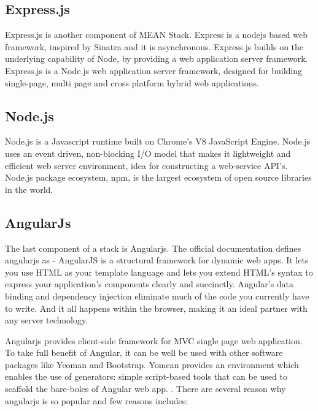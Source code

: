 		
		
		\subsection{Express.js}
		\cite{expressRef}Express.js is another component of MEAN Stack. Express is a nodejs based web framework, inspired by Sinatra and it is asynchronous. Express.js builds on the underlying capability of Node, by providing a web application server framework. Express.js is a Node.js web application server framework, designed for building single-page, multi page and cross platform hybrid web applications\cite{expressRefWiki}. 
		
		\subsection{Node.js}
		Node.js is a Javascript runtime built on Chrome’s V8 JavaScript Engine. Node.js uses an event driven, non-blocking I/O model that makes it lightweight and efficient web server environment, idea for constructing a web-service API’s\cite{Node.jsWiki}. Node.js package ecosystem, npm, is the largest ecosystem of open source libraries in the world. \cite{expressRefWiki} 
		
		\subsection{AngularJs}
		The last component of a stack is Angularjs. The official documentation \cite{Angularjs}defines angularjs as - AngularJS is a structural framework for dynamic web apps. It lets you use HTML as your template language and lets you extend HTML's syntax to express your application's components clearly and succinctly. Angular's data binding and dependency injection eliminate much of the code you currently have to write. And it all happens within the browser, making it an ideal partner with any server technology.
		
		Angularjs provides client-side framework for MVC  \cite{Angularjs} single page web application. To take full benefit of Angular, it can be well be used with other software packages like Yeoman and Bootstrap. Yomean provides an environment which enables the use of generators: simple script-based tools that can be used to scaffold the bare-boles of  Angular web app. \cite{YeomanGenerator}.  There are several reason why angularjs is so popular and few reasons includes: 
		
